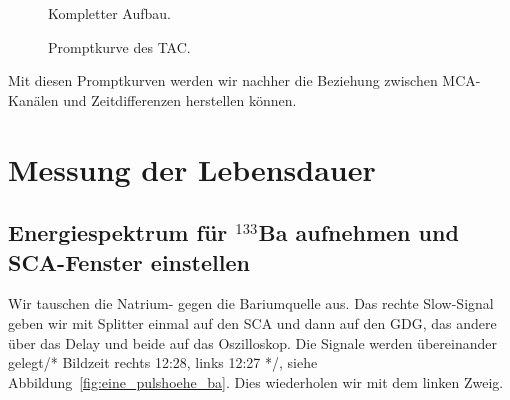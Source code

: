 \begin{figure}[htbp]
    \caption{%
        Kompletter Aufbau.
    }
    \label{fig:aufbau:komplett}
\end{figure}

\begin{figure}[htbp]
    \centering
    \caption{%
        Promptkurve des TAC.
    }
    \label{mca:zeiteichung}
\end{figure}

Mit diesen Promptkurven werden wir nachher die Beziehung zwischen MCA-Kanälen
und Zeitdifferenzen herstellen können.

\section{Messung der Lebensdauer}

\subsection{Energiespektrum für ${}^{133}$Ba aufnehmen und SCA-Fenster
einstellen}

Wir tauschen die Natrium- gegen die Bariumquelle aus. Das rechte Slow-Signal
geben wir mit Splitter einmal auf den SCA und dann auf den GDG, das andere über
das Delay und beide auf das Oszilloskop. Die Signale werden übereinander
gelegt/* Bildzeit rechts 12:28, links 12:27 */, siehe
Abbildung~\ref{fig:eine_pulshoehe_ba}. Dies wiederholen wir mit dem linken
Zweig.

